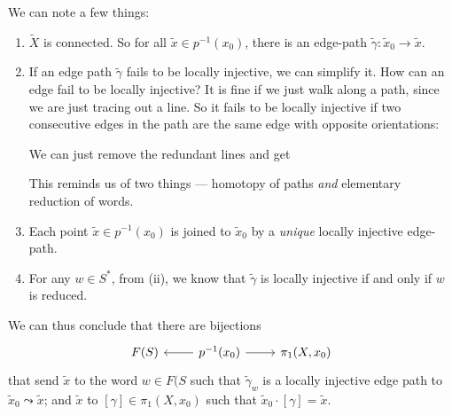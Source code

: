 \documentclass[a4paper]{article}
\begin{document}
We can note a few things:
\begin{enumerate}
  \item $\tilde{X}$ is connected. So for all $\tilde{x} \in p^{-1}(x_0)$, there is an edge-path $\tilde{\gamma}: \tilde{x}_0 \to \tilde{x}$.
  \item If an edge path $\tilde{\gamma}$ fails to be locally injective, we can simplify it. How can an edge fail to be locally injective? It is fine if we just walk along a path, since we are just tracing out a line. So it fails to be locally injective if two consecutive edges in the path are the same edge with opposite orientations:
    \begin{center}
    \end{center}
    We can just remove the redundant lines and get
    \begin{center}
    \end{center}
    This reminds us of two things --- homotopy of paths \emph{and} elementary reduction of words.
  \item Each point $\tilde{x} \in p^{-1}(x_0)$ is joined to $\tilde{x}_0$ by a \emph{unique} locally injective edge-path.
  \item For any $w \in S^*$, from (ii), we know that $\tilde{\gamma}$ is locally injective if and only if $w$ is reduced.
\end{enumerate}
We can thus conclude that there are bijections
\[
  \begin{tikzcd}
    F(S) & p^{-1}(x_0) \ar[l] \ar [r] & \pi_1(X, x_0)
  \end{tikzcd}
\]
that send $\tilde{x}$ to the word $w \in F(S$ such that $\tilde{\gamma}_w$ is a locally injective edge path to $\tilde{x}_0 \leadsto \tilde{x}$; and $\tilde{x}$ to $[\gamma] \in \pi_1(X, x_0)$ such that $\tilde{x}_0 \cdot [\gamma] = \tilde{x}$.
\end{document}
